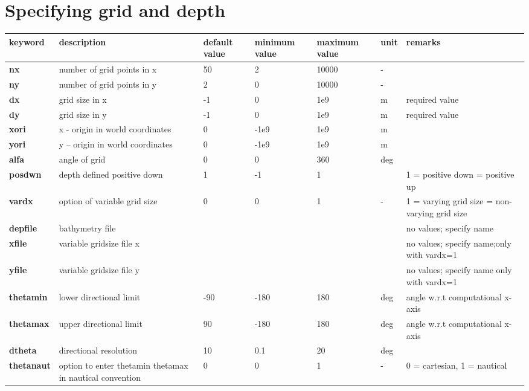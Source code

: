 \section{Specifying grid and depth}

\begin{tabular}{|p{0.5in}|p{0.8in}|p{0.4in}|p{0.5in}|p{0.5in}|p{0.3in}|p{0.7in}|} \hline 
keyword & description & default value & minimum value & maximum value & unit & remarks \\ \hline 
\textbf{nx} & number of grid points in x & 50 & 2 & 10000 & - &  \\ \hline 
\textbf{ny} & number of grid points in y & 2 & 0 & 10000 & - &  \\ \hline 
\textbf{dx} & grid size in x & -1 & 0 & 1e9 & m & required value  \\ \hline 
\textbf{dy} & grid size in y & -1 & 0 & 1e9 & m & required value \\ \hline 
\textbf{xori} & x - origin in world coordinates & 0 & -1e9 & 1e9 & m &  \\ \hline 
\textbf{yori} & y -- origin in world coordinates & 0 & -1e9 & 1e9 & m &  \\ \hline 
\textbf{alfa} & angle of grid & 0 & 0 & 360 & deg &  \\ \hline 
\textbf{posdwn} & depth defined positive down & 1 & -1 & 1 &  & 1 = positive down\newline -1 = positive up \\ \hline 
\textbf{vardx} & option of variable grid size & 0 & 0 & 1 & - & 1 = varying grid size\newline 0 = non-varying grid size \\ \hline 
\textbf{depfile} & bathymetry file &  &  &  &  & no values; specify name \\ \hline 
\textbf{xfile} & variable gridsize  file x &  &  &  &  & no values; specify name;only with vardx=1 \\ \hline 
\textbf{yfile} & variable gridsize file y &  &  &  &  & no values; specify name only with vardx=1 \\ \hline 
\textbf{thetamin } & lower directional limit & -90 & -180 & 180 & deg &  angle w.r.t computational x-axis \\ \hline 
\textbf{thetamax } & upper directional limit & 90 & -180 & 180 & deg &  angle w.r.t computational x-axis \\ \hline 
\textbf{dtheta   } & directional resolution  & 10 & 0.1 & 20 & deg &  \\ \hline 
\textbf{thetanaut} & option to enter thetamin thetamax in nautical convention & 0 & 0 & 1 & - & 0 = cartesian, 1 = nautical \\ \hline 
\end{tabular}

